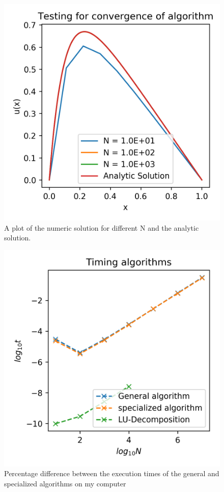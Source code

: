 \documentclass[10pt,showpacs,preprintnumbers,footinbib,amsmath,amssymb,aps,prl,twocolumn,groupedaddress,superscriptaddress,showkeys]{revtex4-1}
\begin{document}
  \begin{figure}[hbtp]
    \center
    \includegraphics[scale=.7]{figs/ex1c_compare.png}
    \caption{A plot of the numeric solution for different N and the analytic solution.}
  \end{figure}

  \begin{figure}[hbtp]
    \center
    \includegraphics[scale=.7]{figs/ex1d_time.png}
    \caption{Percentage difference between the execution times of the general and specialized algorithms on my computer}
  \end{figure}
\end{document}
